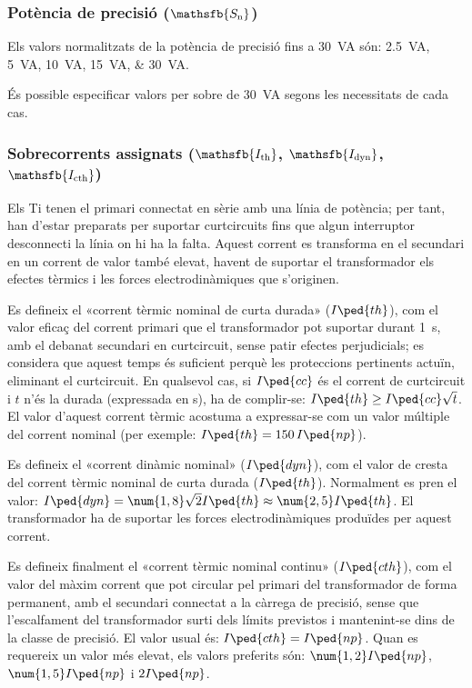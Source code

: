 \subsubsection{Potència de precisió ($\mathsfb{S_\text{n}}$)}

 Els valors normalitzats de la potència de precisió fins a \qty{30}{VA}
són: \qtylist{2,5; 5;10; 15; 30}{VA}.

És possible especificar valors per sobre de \qty{30}{VA} segons les necessitats de cada cas.

\subsubsection{Sobrecorrents  assignats ($\mathsfb{I_\text{th}}$, $\mathsfb{I_\text{dyn}}$, $\mathsfb{I_\text{cth}}$)}

 Els Ti
tenen el primari connectat en sèrie amb una línia de potència; per tant, han
d'estar preparats per suportar curtcircuits fins que algun
interruptor desconnecti la línia on hi ha la falta. Aquest
corrent es transforma en el secundari en un corrent de valor
també elevat, havent de suportar el transformador els efectes tèrmics
i les forces electrodinàmiques que s'originen.

Es defineix el «corrent tèrmic nominal de curta durada»
($I\ped{th}$), com el valor eficaç del  corrent primari que el
transformador pot suportar durant \qty{1}{s}, amb el debanat
secundari en curtcircuit, sense patir efectes perjudicials; es
considera que aquest temps és suficient perquè les proteccions
pertinents actuïn, eliminant el curtcircuit. En qualsevol cas, si
$I\ped{cc}$ és el corrent de curtcircuit i $t$ n'és la durada
(expressada en s), ha de complir-se: $I\ped{th}\geq
I\ped{cc}\sqrt{t}$. El valor d'aquest corrent tèrmic
acostuma a expressar-se com  un valor múltiple del corrent
nominal (per exemple: $I\ped{th}=150\,I\ped{np}$).

Es defineix el «corrent dinàmic nominal» ($I\ped{dyn}$), com el
valor de cresta del corrent tèrmic nominal de curta durada ($I\ped{th}$).
Normalment es pren el valor: $I\ped{dyn} =
\num{1,8}\sqrt{2}I\ped{th}\approx \num{2,5}I\ped{th}$. El transformador ha de
suportar les forces electrodinàmiques produïdes per aquest corrent.

Es defineix finalment el «corrent tèrmic nominal continu» ($I\ped{cth}$), com
el valor del màxim corrent que pot circular pel primari del
transformador  de forma permanent, amb el secundari connectat a la
càrrega de precisió, sense que l'escalfament del transformador surti
dels límits previstos i mantenint-se dins de la
 classe de precisió. El valor usual és: $I\ped{cth} = I\ped{np}$. Quan es requereix un valor més elevat, els valors preferits són:
$\num{1,2}I\ped{np}$, $\num{1,5}I\ped{np}$ i $2 I\ped{np}$.

